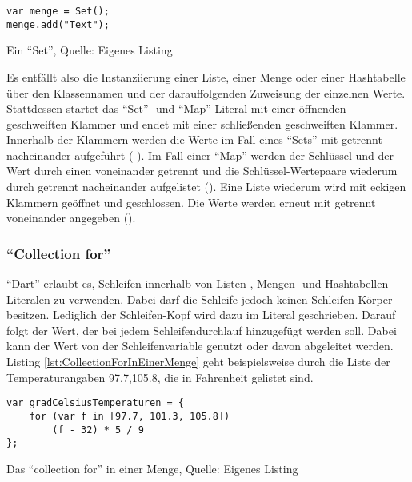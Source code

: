 \ifIncludeFigures
  \begin{listing}[ht]
    \begin{verbatim}
var menge = Set();
menge.add("Text");
\end{verbatim}
    \caption[Ein \enquote{Set}]{Ein \enquote{Set}, Quelle: Eigenes Listing}
    \label{lst:EinSet}
  \end{listing}
\fi

Es entfällt also die Instanziierung einer Liste, einer Menge oder einer Hashtabelle über den Klassennamen und der darauffolgenden Zuweisung der einzelnen Werte.
Stattdessen startet das \enquote{Set}- und \enquote{Map}-Literal mit einer öffnenden geschweiften Klammer und endet mit einer schließenden geschweiften Klammer.
Innerhalb der Klammern werden die Werte im Fall eines \enquote{Sets} mit \IC{,} getrennt nacheinander aufgeführt (  ).
Im Fall einer \enquote{Map} werden der Schlüssel und der Wert durch einen \IC{:} voneinander getrennt und die Schlüssel-Wertepaare wiederum durch \IC{,} getrennt nacheinander aufgelistet ().
Eine Liste wiederum wird mit eckigen Klammern geöffnet und geschlossen.
Die Werte werden erneut mit \IC{,} getrennt voneinander angegeben (\IC{[1,2]}).

\subsubsection{\enquote{Collection for}} \enquote{Dart} erlaubt es, Schleifen innerhalb von Listen-, Mengen- und Hashtabellen-Literalen zu verwenden.
Dabei darf die Schleife jedoch keinen Schleifen-Körper besitzen.
Lediglich der Schleifen-Kopf wird dazu im Literal geschrieben.
Darauf folgt der Wert, der bei jedem Schleifendurchlauf hinzugefügt werden soll.
Dabei kann der Wert von der Schleifenvariable genutzt oder davon abgeleitet werden.
Listing \ref{lst:CollectionForInEinerMenge} geht beispielsweise durch die Liste der Temperaturangaben 97.7,105.8, die in Fahrenheit gelistet sind.

\ifIncludeFigures
  \begin{listing}[ht]
    \begin{verbatim}
var gradCelsiusTemperaturen = {
    for (var f in [97.7, 101.3, 105.8])
        (f - 32) * 5 / 9
};
\end{verbatim}
    \caption[Das \enquote{collection for} in einer Menge]{Das \enquote{collection for} in einer Menge, Quelle: Eigenes Listing}
    \label{lst:CollectionForInEinerMenge}
  \end{listing}
\fi

